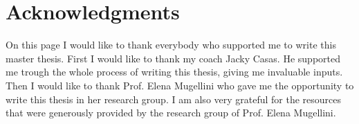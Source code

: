 \documentclass[11pt,a4paper,twoside,hidelinks,]{rvsmaster}
\makeatletter
\def\cleardoublepage{\clearpage\if@twoside \ifodd\c@page\else
	\hbox{}
	\thispagestyle{empty}
	\newpage
\fi\fi}
\makeatother
\begin{document}
\tableofcontents{}
\listoffigures{}
\listoftables{}



\chapter*{Acknowledgments}
On this page I would like to thank everybody who supported me to write this master thesis.
First I would like to thank my coach Jacky Casas. He supported me trough the whole process of writing this thesis, giving  me invaluable inputs.
Then I would like to thank Prof. Elena Mugellini who gave me the opportunity to write this thesis in her research group. I am also very grateful for the resources that were generously provided by the research group of Prof. Elena Mugellini.

\cleardoublepage
\setcounter{page}{1}	%













\end{document}
